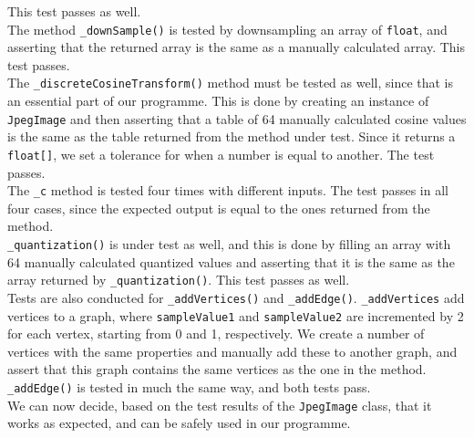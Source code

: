 This test passes as well.\\
The method \lstinline|_downSample()| is tested by downsampling an array of \lstinline|float|, and asserting that the returned array is the same as a manually calculated array.
This test passes.\\
The \lstinline|_discreteCosineTransform()| method must be tested as well, since that is an essential part of our programme.
This is done by creating an instance of \lstinline|JpegImage| and then asserting that a table of 64 manually calculated cosine values is the same as the table returned from the method under test.
Since it returns a \lstinline|float[]|, we set a tolerance for when a number is equal to another.
The test passes.\\
The \lstinline|_c| method is tested four times with different inputs.
The test passes in all four cases, since the expected output is equal to the ones returned from the method.\\
\lstinline|_quantization()| is under test as well, and this is done by filling an array with 64 manually calculated quantized values and asserting that it is the same as the array returned by \lstinline|_quantization()|.
This test passes as well.\\
Tests are also conducted for \lstinline|_addVertices()| and \lstinline|_addEdge()|.
\lstinline|_addVertices| add vertices to a graph, where \lstinline|sampleValue1| and \lstinline|sampleValue2| are incremented by 2 for each vertex, starting from 0 and 1, respectively.
We create a number of vertices with the same properties and manually add these to another graph, and assert that this graph contains the same vertices as the one in the method.
\lstinline|_addEdge()| is tested in much the same way, and both tests pass.\\
We can now decide, based on the test results of the \lstinline|JpegImage| class, that it works as expected, and can be safely used in our programme.

